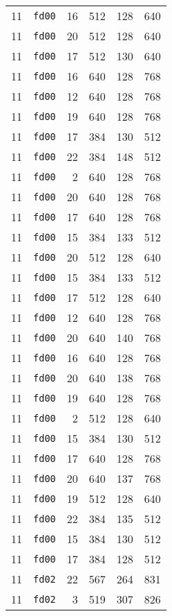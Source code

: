 \documentclass{article}
\begin{document}
\begin{table}[h!]
\begin{tabular}{llrrrl}
    11 & \texttt{fd00} & 16 & 512 & 128 & 640 \\
    11 & \texttt{fd00} & 20 & 512 & 128 & 640 \\
    11 & \texttt{fd00} & 17 & 512 & 130 & 640 \\
    11 & \texttt{fd00} & 16 & 640 & 128 & 768 \\
    11 & \texttt{fd00} & 12 & 640 & 128 & 768 \\
    11 & \texttt{fd00} & 19 & 640 & 128 & 768 \\
    11 & \texttt{fd00} & 17 & 384 & 130 & 512 \\
    11 & \texttt{fd00} & 22 & 384 & 148 & 512 \\
    11 & \texttt{fd00} & 2 & 640 & 128 & 768 \\
    11 & \texttt{fd00} & 20 & 640 & 128 & 768 \\
    11 & \texttt{fd00} & 17 & 640 & 128 & 768 \\
    11 & \texttt{fd00} & 15 & 384 & 133 & 512 \\
    11 & \texttt{fd00} & 20 & 512 & 128 & 640 \\
    11 & \texttt{fd00} & 15 & 384 & 133 & 512 \\
    11 & \texttt{fd00} & 17 & 512 & 128 & 640 \\
    11 & \texttt{fd00} & 12 & 640 & 128 & 768 \\
    11 & \texttt{fd00} & 20 & 640 & 140 & 768 \\
    11 & \texttt{fd00} & 16 & 640 & 128 & 768 \\
    11 & \texttt{fd00} & 20 & 640 & 138 & 768 \\
    11 & \texttt{fd00} & 19 & 640 & 128 & 768 \\
    11 & \texttt{fd00} & 2 & 512 & 128 & 640 \\
    11 & \texttt{fd00} & 15 & 384 & 130 & 512 \\
    11 & \texttt{fd00} & 17 & 640 & 128 & 768 \\
    11 & \texttt{fd00} & 20 & 640 & 137 & 768 \\
    11 & \texttt{fd00} & 19 & 512 & 128 & 640 \\
    11 & \texttt{fd00} & 22 & 384 & 135 & 512 \\
    11 & \texttt{fd00} & 15 & 384 & 130 & 512 \\
    11 & \texttt{fd00} & 17 & 384 & 128 & 512 \\
    11 & \texttt{fd02} & 22 & 567 & 264 & 831 \\
    11 & \texttt{fd02} & 3 & 519 & 307 & 826 \\

\end{tabular}
\end{table}
\end{document}
